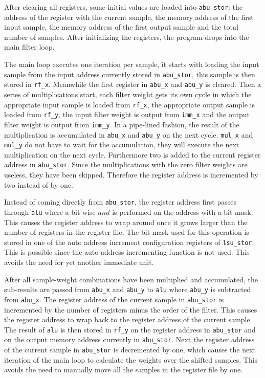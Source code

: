 \documentclass[10pt,twocolumn]{article}
\begin{document}
After clearing all registers, some initial values are loaded into
\texttt{abu\_stor}: the address of the register with the current
sample, the memory address of the first input sample, the memory
address of the first output sample and the total number of samples.
After initializing the registers, the program drops into the main
filter loop.


The main loop executes one iteration per sample, it starts with
loading the input sample from the input address currently stored in
\texttt{abu\_stor}, this sample is then stored in \texttt{rf\_x}.
Meanwhile the first register in \texttt{abu\_x} and \texttt{abu\_y} is
cleared. Then a series of multiplications start, each filter weight
gets its own cycle in which the appropriate input sample is loaded
from \texttt{rf\_x}, the appropriate output sample is loaded from
\texttt{rf\_y}, the input filter weight is output from \texttt{imm\_x}
and the output filter weight is output from \texttt{imm\_y}. In a
pipe-lined fashion, the result of the multiplication is accumulated in
\texttt{abu\_x} and \texttt{abu\_y} on the next cycle. \texttt{mul\_x}
and \texttt{mul\_y} do not have to wait for the accumulation, they
will execute the next multiplication on the next cycle. Furthermore
two is added to the current register address in \texttt{abu\_stor}.
Since the multiplications with the zero filter weights are useless,
they have been skipped. Therefore the register address is incremented
by two instead of by one.

Instead of coming directly from \texttt{abu\_stor}, the register
address first passes through \texttt{alu} where a bit-wise $and$ is
performed on the address with a bit-mask. This causes the register
address to wrap around once it grows larger than the number of
registers in the register file. The bit-mask used for this operation
is stored in one of the auto address increment configuration registers
of \texttt{lsu\_stor}. This is possible since the auto address
incrementing function is not used. This avoids the need for yet
another immediate unit.

After all sample-weight combinations have been multiplied and
accumulated, the sub-results are passed from \texttt{abu\_x} and
\texttt{abu\_y} to \texttt{alu} where \texttt{abu\_y} is subtracted
from \texttt{abu\_x}. The register address of the current sample in
\texttt{abu\_stor} is incremented by the number of registers minus the
order of the filter. This causes the register address to wrap back to
the register address of the current sample. The result of \texttt{alu}
is then stored in \texttt{rf\_y} on the register address in
\texttt{abu\_stor} and on the output memory address currently in
\texttt{abu\_stor}. Next the register address of the current sample in
\texttt{abu\_stor} is decremented by one, which causes the next
iteration of the main loop to calculate the weights over the shifted
samples. This avoids the need to manually move all the samples in the
register file by one.
\end{document}
